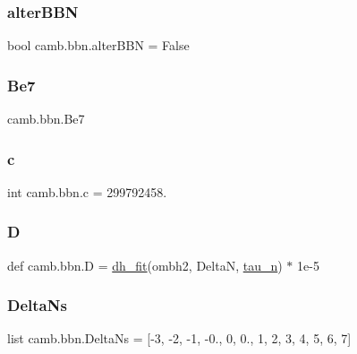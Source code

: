 \mbox{\label{namespacecamb_1_1bbn_ae20f3b2b5c14d3eca9a605dae38f925c}} 
\subsubsection{\texorpdfstring{alter\+B\+BN}{alterBBN}}
{\footnotesize\ttfamily bool camb.\+bbn.\+alter\+B\+BN = False}

\mbox{\label{namespacecamb_1_1bbn_a9f11f11ecaabe89c8896dc10706dbe3a}} 
\subsubsection{\texorpdfstring{Be7}{Be7}}
{\footnotesize\ttfamily camb.\+bbn.\+Be7}

\mbox{\label{namespacecamb_1_1bbn_a679cc6941c03606fb81846de0595bbf0}} 
\subsubsection{\texorpdfstring{c}{c}}
{\footnotesize\ttfamily int camb.\+bbn.\+c = 299792458.}

\mbox{\label{namespacecamb_1_1bbn_a14c1aca700dca106cc95088e75fbb0bf}} 
\subsubsection{\texorpdfstring{D}{D}}
{\footnotesize\ttfamily def camb.\+bbn.\+D = \mbox{\hyperlink{namespacecamb_1_1bbn_a631c65a5e52fd772fd227d7017dccf34}{dh\+\_\+fit}}(ombh2, DeltaN, \mbox{\hyperlink{namespacecamb_1_1bbn_ae95abe1177100ca3b8cfb59cf9e379be}{tau\+\_\+n}}) $\ast$ 1e-\/5}

\mbox{\label{namespacecamb_1_1bbn_a2d30a7a9ec202c2f72d1fa5d58aa1cb5}} 
\subsubsection{\texorpdfstring{Delta\+Ns}{DeltaNs}}
{\footnotesize\ttfamily list camb.\+bbn.\+Delta\+Ns = \mbox{[}-\/3, -\/2, -\/1, -\/0., 0, 0., 1, 2, 3, 4, 5, 6, 7\mbox{]}}

